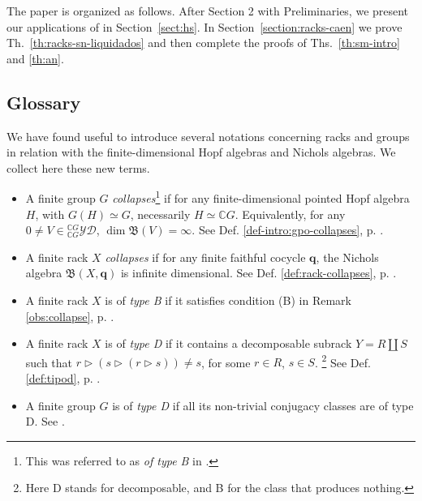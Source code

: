 \documentclass[11pt]{amsart} \textheight 22cm
\renewcommand{\^}[1]{\mbox{$^{\left( #1 \right)}$}}
\renewcommand{\_}[1]{\mbox{$_{\left( #1 \right)}$}}
\newcommand\toba{{\mathfrak B }}
\newcommand{\trid}{\triangleright}
\newcommand{\ku}{\mathbb C}
\newcommand{\q}{{\mathbf q}}
\newcommand{\ydg}{{}^{\ku G}_{\ku G}\mathcal{YD}}
\theoremstyle{plain}
\theoremstyle{definition}
\theoremstyle{remark}
\theoremstyle{remark}
\begin{document}
\medbreak The paper is organized as follows. After Section 2 with
Preliminaries, we present our applications of \cite[Th. 8.6]{HS1}
in Section~\ref{sect:hs}. In Section~\ref{section:racks-caen} we
prove Th.~\ref{th:racks-sn-liquidados} and then complete the
proofs of Ths.~\ref{th:sm-intro} and \ref{th:an}.

\medbreak \subsection{Glossary}\label{subsec:glossary} We have
found useful to introduce several notations concerning racks and
groups in relation with the finite-dimensional Hopf algebras and
Nichols algebras. We collect here these new terms.


\begin{itemize}
    \item A finite group $G$ \emph{collapses}\footnote{This was referred to as \emph{of type B} in \cite{FGV}.}
    if for any finite-dimensional
    pointed Hopf algebra $H$, with $G(H) \simeq G$, necessarily $H\simeq\ku
    G$. Equivalently, for any $0\neq V\in \ydg$,    $\dim \toba(V) = \infty$. See Def.
    \ref{def-intro:gpo-collapses}, p.
    \pageref{def-intro:gpo-collapses}.


 \smallbreak\item A finite rack $X$ \emph{collapses} if for any finite faithful cocycle
    $\q$, the Nichols algebra $\toba(X,\q)$ is infinite dimensional. See Def.
    \ref{def:rack-collapses}, p. \pageref{def:rack-collapses}.

 \smallbreak\item A finite rack $X$ is of \emph{type B} if it
 satisfies condition (B) in Remark \ref{obs:collapse}, p.
 \pageref{def:tipob}.


 \smallbreak\item A finite rack $X$ is of \emph{type D} if it
 contains a decomposable subrack $Y = R\coprod S$  such that
$r\trid(s\trid(r\trid s)) \neq s$, for some $r\in R$, $s\in S$. \footnote{Here D stands for decomposable, and B for
the class that produces nothing.}
See Def. \ref{def:tipod}, p. \pageref{def:tipod}.

 \smallbreak\item A finite group $G$ is of \emph{type D} if all its
    non-trivial conjugacy classes are of type D. See \cite{afgv-spor}.
\end{itemize}
\end{document}

